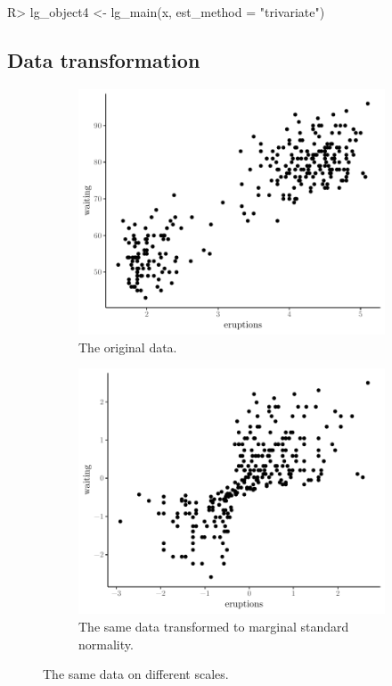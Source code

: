 \begin{example}
R> lg_object4 <- lg_main(x, est_method = "trivariate")
\end{example}

\subsection{Data transformation}
\label{data-transformation}

\begin{figure}[t]
    \centering
    \begin{subfigure}[t]{0.48\textwidth}
      \includegraphics[width=\textwidth]{faithful}
      \caption{The original data.}
    \end{subfigure}
    \begin{subfigure}[t]{0.48\textwidth}
      \includegraphics[width=\textwidth]{faithful-transformed}
      \caption{The same data transformed to marginal standard normality.}
    \end{subfigure}
    \caption{The same data on different scales.}
    \label{fig:faithful}
  \end{figure}


